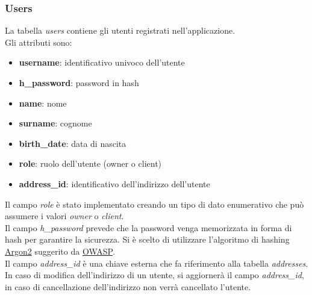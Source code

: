 \subsubsection{Users}
\label{sec:users}
La tabella \textit{users} contiene gli utenti registrati 
nell'applicazione.\\
Gli attributi sono:
\begin{itemize}
    \item \textbf{username}: identificativo univoco dell'utente
    \item \textbf{h\_password}: password in hash
    \item \textbf{name}: nome
    \item \textbf{surname}: cognome
    \item \textbf{birth\_date}: data di nascita
    \item \textbf{role}: ruolo dell'utente (owner o client)
    \item \textbf{address\_id}: identificativo dell'indirizzo dell'utente
\end{itemize}
Il campo \textit{role} è stato implementato creando un tipo di 
dato enumerativo che può assumere i valori \textit{owner} o \textit{client}.\\
Il campo \textit{h\_password} prevede che la password venga 
memorizzata in forma di hash per garantire la sicurezza.
Si è scelto di utilizzare l'algoritmo di hashing 
\href{https://github.com/p-h-c/phc-winner-argon2}{Argon2} suggerito 
da \href{https://cheatsheetseries.owasp.org/cheatsheets/Password_Storage_Cheat_Sheet.html}{OWASP}.\\
Il campo \textit{address\_id} è una chiave esterna che fa riferimento 
alla tabella \textit{addresses}. 
In caso di modifica dell'indirizzo
di un utente, si aggiornerà il campo \textit{address\_id}, in caso 
di cancellazione dell'indirizzo non verrà cancellato l'utente.

